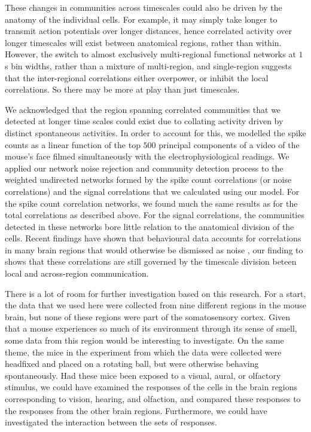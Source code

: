 These changes in communities across timescales could also be driven by the anatomy of the individual cells. For example, it may simply take longer to transmit action potentials over longer distances, hence correlated activity over longer timescales will exist between anatomical regions, rather than within. However, the switch to almost exclusively multi-regional functional networks at $1$s bin widths, rather than a mixture of multi-region, and single-region suggests that the inter-regional correlations either overpower, or inhibit the local correlations. So there may be more at play than just timescales.

We acknowledged that the region spanning correlated communities that we detected at longer time scales could exist due to collating activity driven by distinct spontaneous activities. In order to account for this, we modelled the spike counts as a linear function of the top $500$ principal components of a video of the mouse's face filmed simultaneously with the electrophysiological readings. We applied our network noise rejection and community detection process to the weighted undirected networks formed by the spike count correlations (or noise correlations) and the signal correlations that we calculated using our model. For the spike count correlation networks, we found much the same results as for the total correlations as described above. For the signal correlations, the communities detected in these networks bore little relation to the anatomical division of the cells. Recent findings have shown that behavioural data accounts for correlations in many brain regions that would otherwise be dismissed as noise \parencite{stringer}, our finding to shows that these correlations are still governed by the timescale division beteen local and across-region communication.

There is a lot of room for further investigation based on this research. For a start, the data that we used here were collected from nine different regions in the mouse brain, but none of these regions were part of the somatosensory cortex. Given that a mouse experiences so much of its environment through its sense of smell, some data from this region would be interesting to investigate. On the same theme, the mice in the experiment from which the data were collected were headfixed and placed on a rotating ball, but were otherwise behaving spontaneously. Had these mice been exposed to a visual, aural, or olfactory stimulus, we could have examined the responses of the cells in the brain regions corresponding to vision, hearing, and olfaction, and compared these responses to the responses from the other brain regions. Furthermore, we could have investigated the interaction between the sets of responses.

